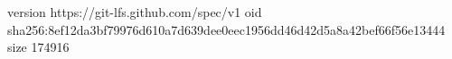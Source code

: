 version https://git-lfs.github.com/spec/v1
oid sha256:8ef12da3bf79976d610a7d639dee0eec1956dd46d42d5a8a42bef66f56e13444
size 174916
